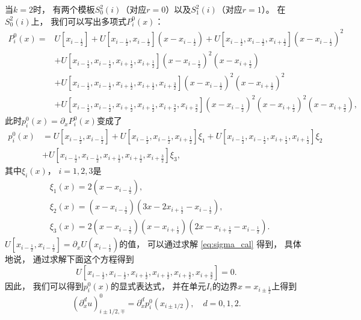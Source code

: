 当$k=2$时，
有两个模板$S^2_0(i)$（对应$r=0$）以及$S^2_1(i)$（对应$r=1$）。
在$S^2_0(i)$上，
我们可以写出多项式$P^0_{i}(x)$：
\begin{equation}
  \begin{aligned}
    P^0_{i}(x) =
     & U[x_{i-\frac 12}] + U[x_{i-\frac 12},x_{i-\frac 12}](x-x_{i-\frac 12}) + U[x_{i-\frac 12},x_{i-\frac 12},x_{i+\frac 12}](x-x_{i-\frac 12})^2                        \\
     & + U[x_{i-\frac 12},x_{i-\frac 12},x_{i+\frac 12},x_{i+\frac 12}](x-x_{i-\frac 12})^2(x-x_{i+\frac 12})                                                              \\
     & + U[x_{i-\frac 12},x_{i-\frac 12},x_{i+\frac 12},x_{i+\frac 12},x_{i+\frac{3}{2}}](x-x_{i-\frac 12})^2(x-x_{i+\frac 12})^2                                          \\
     & + U[x_{i-\frac 12},x_{i-\frac 12},x_{i+\frac 12},x_{i+\frac 12},x_{i+\frac{3}{2}},x_{i+\frac{3}{2}}](x-x_{i-\frac 12})^2(x-x_{i+\frac 12})^2(x-x_{i+\frac{3}{2}}),
  \end{aligned}
\end{equation}
此时$p^0_{i}(x)={\partial_x}P^0_{i}(x)$变成了
\begin{equation}
  \label{eq:HC-2}
  \begin{aligned}
    p^0_{i}(x)
     & = U[x_{i-\frac 12},x_{i-\frac 12}] + U[x_{i-\frac 12},x_{i-\frac 12},x_{i+\frac 12}]\xi_1 + U[x_{i-\frac 12},x_{i-\frac 12},x_{i+\frac 12},x_{i+\frac 12}]\xi_2 \\
     & + U[x_{i-\frac 12},x_{i-\frac 12},x_{i+\frac 12},x_{i+\frac 12},x_{i+\frac{3}{2}}]\xi_3,
  \end{aligned}
\end{equation}
其中$\xi_i(x)$，
$i=1,2,3$是
\begin{align}
   & \xi_1(x) = 2(x-x_{i-\frac 12}),                                                    \\
   & \xi_2(x) = (x-x_{i-\frac 12})(3x-2x_{i+\frac 12}-x_{i-\frac 12}),                  \\
   & \xi_3(x)=2(x-x_{i-\frac 12})(x-x_{i+\frac 12})(2x-x_{i+\frac 12}-x_{i-\frac 12}).
\end{align}
$U[x_{i-\frac 12},x_{i-\frac 12}] = {\partial_x}U(x_{i-\frac 12})$的值，
可以通过求解 \cref{eq:sigma_cal} 得到，
具体地说，
通过求解下面这个方程得到
\begin{equation}
  U[x_{i-\frac 12},x_{i-\frac 12},x_{i+\frac 12},x_{i+\frac 12},x_{i+\frac 32},x_{i+\frac{3}{2}}] = 0.
\end{equation}
因此，
我们可以得到$p^0_{i}(x)$的显式表达式，
并在单元$I_{i}$的边界$x=x_{i\pm \frac 12}$上得到
\begin{equation}
  ({\partial_x^d} u)_{i\pm1 / 2,\mp}^0 = {\partial_x^d} p^0_{i}(x_{i\pm1/2}), \quad d=0,1,2.
\end{equation}

